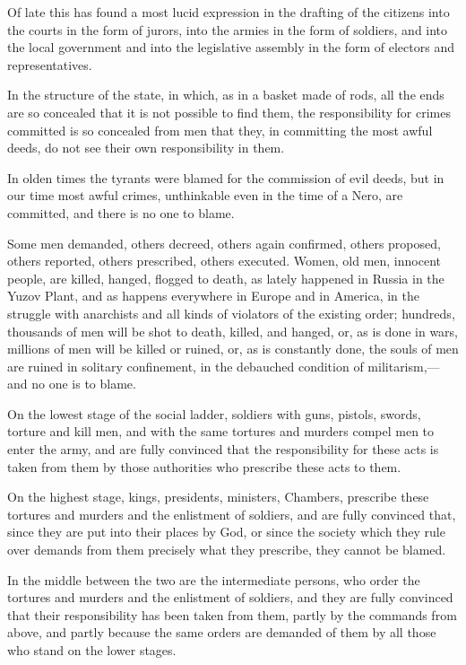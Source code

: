 \documentclass{book}
\begin{document}
Of late this has found a most lucid expression in the drafting of the citizens into the courts in the form of jurors, into the armies in the form of soldiers, and into the local government and into the legislative assembly in the form of electors and representatives.

In the structure of the state, in which, as in a basket made of rods, all the ends are so concealed that it is not possible to find them, the responsibility for crimes committed is so concealed from men that they, in committing the most awful deeds, do not see their own responsibility in them.

In olden times the tyrants were blamed for the commission of evil deeds, but in our time most awful crimes, unthinkable even in the time of a Nero, are committed, and there is no one to blame.

Some men demanded, others decreed, others again confirmed, others proposed, others reported, others prescribed, others executed. Women, old men, innocent people, are killed, hanged, flogged to death, as lately happened in Russia in the Yuzov Plant, and as happens everywhere in Europe and in America, in the struggle with anarchists and all kinds of violators of the existing order; hundreds, thousands of men will be shot to death, killed, and hanged, or, as is done in wars, millions of men will be killed or ruined, or, as is constantly done, the souls of men are ruined in solitary confinement, in the debauched condition of militarism,—and no one is to blame.

On the lowest stage of the social ladder, soldiers with guns, pistols, swords, torture and kill men, and with the same tortures and murders compel men to enter the army, and are fully convinced that the responsibility for these acts is taken from them by those authorities who prescribe these acts to them.

On the highest stage, kings, presidents, ministers, Chambers, prescribe these tortures and murders and the enlistment of soldiers, and are fully convinced that, since they are put into their places by God, or since the society which they rule over demands from them precisely what they prescribe, they cannot be blamed.

In the middle between the two are the intermediate persons, who order the tortures and murders and the enlistment of soldiers, and they are fully convinced that their responsibility has been taken from them, partly by the commands from above, and partly because the same orders are demanded of them by all those who stand on the lower stages.
\end{document}
